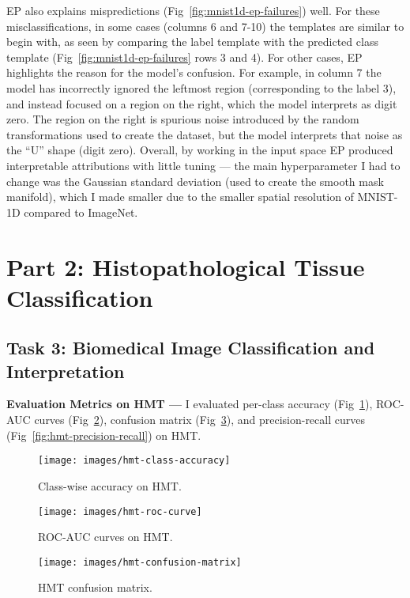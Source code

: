 \documentclass{article}
\newcommand{\myparagraph}[1]{\noindent\textbf{#1 ---}}
\begin{document}
EP also explains mispredictions (Fig~\ref{fig:mnist1d-ep-failures}) well.
For these misclassifications, in some cases (columns 6 and 7-10) the templates are similar to begin with, as seen by comparing the label template with the predicted class template (Fig~\ref{fig:mnist1d-ep-failures} rows 3 and 4).
For other cases, EP highlights the reason for the model's confusion.
For example, in column 7 the model has incorrectly ignored the leftmost region (corresponding to the label 3), and instead focused on a region on the right, which the model interprets as digit zero.
The region on the right is spurious noise introduced by the random transformations used to create the dataset, but the model interprets that noise as the ``U'' shape (digit zero).
Overall, by working in the input space EP produced interpretable attributions with little tuning --- the main hyperparameter I had to change was the Gaussian standard deviation (used to create the smooth mask manifold), which I made smaller due to the smaller spatial resolution of MNIST-1D compared to ImageNet.


\section{Part 2: Histopathological Tissue Classification}

\subsection{Task 3: Biomedical Image Classification and Interpretation}

\myparagraph{Evaluation Metrics on HMT} I evaluated per-class accuracy (Fig~\ref{fig:hmt-classwise-accuracy}), ROC-AUC curves (Fig~\ref{fig:hmt-roc-curve}), confusion matrix (Fig~\ref{fig:hmt-confusion-matrix}), and precision-recall curves (Fig~\ref{fig:hmt-precision-recall}) on HMT\@.
\begin{figure}[t]
	\texttt{[image: images/hmt-class-accuracy]}
	\caption{\label{fig:hmt-classwise-accuracy}Class-wise accuracy on HMT\@.}
\end{figure}

\begin{figure}[t]
	\texttt{[image: images/hmt-roc-curve]}
	\caption{\label{fig:hmt-roc-curve}ROC-AUC curves on HMT\@.}
\end{figure}

\begin{figure}[t]
	\texttt{[image: images/hmt-confusion-matrix]}
	\caption{\label{fig:hmt-confusion-matrix}HMT confusion matrix.}
\end{figure}
\end{document}
